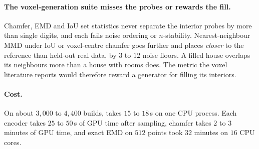 \paragraph{The voxel-generation suite misses the probes or rewards the fill.} Chamfer,
EMD and IoU set statistics never separate the interior probes by more than single digits,
and each fails noise ordering or $n$-stability. Nearest-neighbour MMD under IoU or
voxel-centre chamfer goes further and places \solidify{} \emph{closer} to the reference
than held-out real data, by $3$ to $12$ noise floors. A filled house overlaps its
neighbours more than a house with rooms does. The metric the voxel literature reports
would therefore reward a generator for filling its interiors.

\paragraph{Cost.} On about $3{,}000$ to $4{,}400$ builds, \vkid{} takes $15$ to $18$\,s on
one CPU process. Each encoder takes $25$ to $50$\,s of GPU time after sampling, chamfer
takes $2$ to $3$ minutes of GPU time, and exact EMD on $512$ points took $32$ minutes on
$16$ CPU cores.
